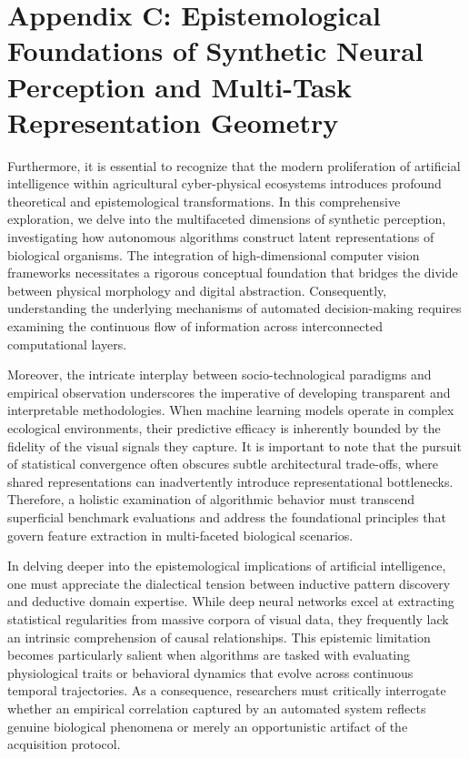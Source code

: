 \documentclass[Times,12pt,oneside,openany,print,index]{report}
\begin{document}
\setcounter{page}{41}
\chapter*{Appendix C: Epistemological Foundations of Synthetic Neural Perception and Multi-Task Representation Geometry}

Furthermore, it is essential to recognize that the modern proliferation of artificial intelligence within agricultural cyber-physical ecosystems introduces profound theoretical and epistemological transformations. In this comprehensive exploration, we delve into the multifaceted dimensions of synthetic perception, investigating how autonomous algorithms construct latent representations of biological organisms. The integration of high-dimensional computer vision frameworks necessitates a rigorous conceptual foundation that bridges the divide between physical morphology and digital abstraction. Consequently, understanding the underlying mechanisms of automated decision-making requires examining the continuous flow of information across interconnected computational layers.

Moreover, the intricate interplay between socio-technological paradigms and empirical observation underscores the imperative of developing transparent and interpretable methodologies. When machine learning models operate in complex ecological environments, their predictive efficacy is inherently bounded by the fidelity of the visual signals they capture. It is important to note that the pursuit of statistical convergence often obscures subtle architectural trade-offs, where shared representations can inadvertently introduce representational bottlenecks. Therefore, a holistic examination of algorithmic behavior must transcend superficial benchmark evaluations and address the foundational principles that govern feature extraction in multi-faceted biological scenarios.

In delving deeper into the epistemological implications of artificial intelligence, one must appreciate the dialectical tension between inductive pattern discovery and deductive domain expertise. While deep neural networks excel at extracting statistical regularities from massive corpora of visual data, they frequently lack an intrinsic comprehension of causal relationships. This epistemic limitation becomes particularly salient when algorithms are tasked with evaluating physiological traits or behavioral dynamics that evolve across continuous temporal trajectories. As a consequence, researchers must critically interrogate whether an empirical correlation captured by an automated system reflects genuine biological phenomena or merely an opportunistic artifact of the acquisition protocol.
\end{document}
